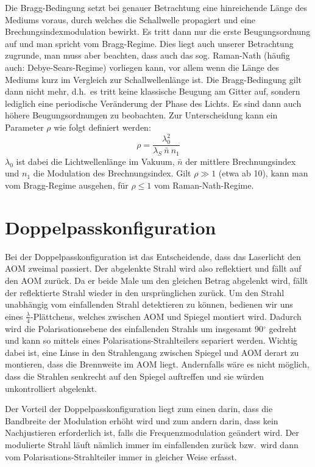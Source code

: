 \documentclass[bigchapter,colorback,accentcolor=tud4b,linedtoc,11pt]{tudreport}
\begin{document}
Die Bragg-Bedingung setzt bei genauer Betrachtung eine hinreichende Länge des Mediums voraus, durch welches die Schallwelle propagiert und eine Brechungsindexmodulation bewirkt. Es tritt dann nur die erste Beugungsordnung auf und man spricht vom Bragg-Regime. Dies liegt auch unserer Betrachtung zugrunde, man muss aber beachten, dass auch das sog. Raman-Nath (häufig auch: Debye-Sears-Regime) vorliegen kann, vor allem wenn die Länge des Mediums kurz im Vergleich zur Schallwellenlänge ist. Die Bragg-Bedingung gilt dann nicht mehr, d.h.\ es tritt keine klassische Beugung am Gitter auf, sondern lediglich eine periodische Veränderung der Phase des Lichts. Es sind dann auch höhere Beugungsordnungen zu beobachten. Zur Unterscheidung kann ein Parameter $\rho$ wie folgt definiert werden: 
$$\rho = \frac{\lambda_0^2}{\lambda_S~\bar{n}~n_1}$$
$\lambda_0$ ist dabei die Lichtwellenlänge im Vakuum, $\bar{n}$ der mittlere Brechnungsindex und $n_1$ die Modulation des Brechnungsindex. Gilt $\rho \gg 1$ (etwa ab 10), kann man vom Bragg-Regime ausgehen, für $\rho \leq 1$ vom Raman-Nath-Regime.

\section{Doppelpasskonfiguration}

Bei der Doppelpasskonfiguration ist das Entscheidende, dass das Laserlicht den AOM zweimal passiert. Der abgelenkte Strahl wird also reflektiert und fällt auf den AOM zurück. Da er beide Male um den gleichen Betrag abgelenkt wird, fällt der reflektierte Strahl wieder in den ursprünglichen zurück. Um den Strahl unabhängig vom einfallenden Strahl detektieren zu können, bedienen wir uns eines $\frac{\lambda}{4}$-Plättchens, welches zwischen AOM und Spiegel montiert wird. Dadurch wird die Polarisationsebene des einfallenden Strahls um insgesamt 90$^{\circ}$ gedreht und kann so mittels eines Polarisations-Strahlteilers separiert werden. Wichtig dabei ist, eine Linse in den Strahlengang zwischen Spiegel und AOM derart zu montieren, dass die Brennweite im AOM liegt. Andernfalls wäre es nicht möglich, dass die Strahlen senkrecht auf den Spiegel auftreffen und sie würden unkontrolliert abgelenkt.

Der Vorteil der Doppelpasskonfiguration liegt zum einen darin, dass die Bandbreite der Modulation erhöht wird und zum andern darin, dass kein Nachjustieren erforderlich ist, falls die Frequenzmodulation geändert wird. Der modulierte Strahl läuft nämlich immer im einfallenden zurück bzw.\ wird dann vom Polarisations-Strahlteiler immer in gleicher Weise erfasst.
\end{document}
